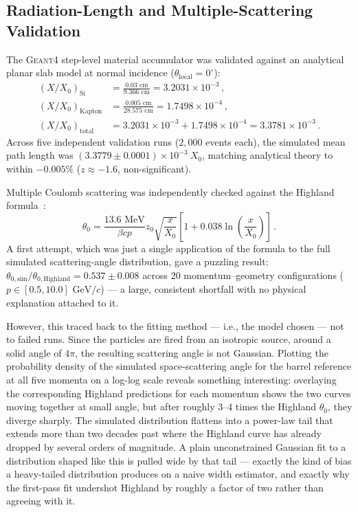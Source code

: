 \documentclass[a4paper,11pt]{article}
\begin{document}
\subsection{Radiation-Length and Multiple-Scattering Validation}
\label{sec:validation}

The \textsc{Geant4} step-level material accumulator was validated against an analytical planar slab model at normal incidence ($\theta_{\text{local}} = 0^\circ$):
\begin{align}
(X/X_0)_{\text{Si}} &= \frac{0.03\text{ cm}}{9.366\text{ cm}} = 3.2031 \times 10^{-3}\,, \label{eq:x0_si} \\
(X/X_0)_{\text{Kapton}} &= \frac{0.005\text{ cm}}{28.575\text{ cm}} = 1.7498 \times 10^{-4}\,, \label{eq:x0_kapton} \\
(X/X_0)_{\text{total}} &= 3.2031 \times 10^{-3} + 1.7498 \times 10^{-4} = 3.3781 \times 10^{-3}\,. \label{eq:x0_total}
\end{align}
Across five independent validation runs ($2{,}000$ events each), the simulated mean path length was $(3.3779 \pm 0.0001) \times 10^{-3}\ X_0$, matching analytical theory to within $-0.005\%$ ($z \approx -1.6$, non-significant).

Multiple Coulomb scattering was independently checked against the Highland formula~\cite{Highland1975, Lynch1991}:
\begin{equation}
\label{eq:highland}
\theta_0 = \frac{13.6\text{ MeV}}{\beta c p} z_0 \sqrt{\frac{x}{X_0}} \left[ 1 + 0.038 \ln \left( \frac{x}{X_0} \right) \right]\,.
\end{equation}
A first attempt, which was just a single application of the formula to the full simulated scattering-angle distribution, gave a puzzling result: $\theta_{0,\text{sim}} / \theta_{0,\text{Highland}} = 0.537 \pm 0.008$ across 20 momentum--geometry configurations ($p \in [0.5, 10.0]\text{ GeV}/c$) --- a large, consistent shortfall with no physical explanation attached to it.

However, this traced back to the fitting method --- i.e., the model chosen --- not to failed runs. Since the particles are fired from an isotropic source, around a solid angle of $4\pi$, the resulting scattering angle is not Gaussian. Plotting the probability density of the simulated space-scattering angle for the barrel reference at all five momenta on a log-log scale reveals something interesting: overlaying the corresponding Highland predictions for each momentum shows the two curves moving together at small angle, but after roughly 3--4 times the Highland $\theta_0$, they diverge sharply. The simulated distribution flattens into a power-law tail that extends more than two decades past where the Highland curve has already dropped by several orders of magnitude. A plain unconstrained Gaussian fit to a distribution shaped like this is pulled wide by that tail --- exactly the kind of bias a heavy-tailed distribution produces on a naive width estimator, and exactly why the first-pass fit undershot Highland by roughly a factor of two rather than agreeing with it.
\end{document}
